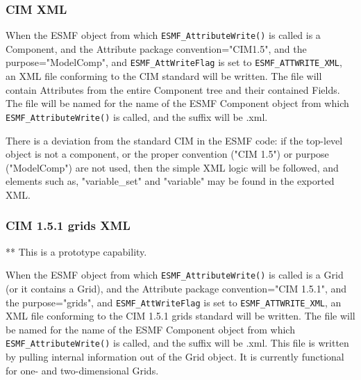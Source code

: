 \subsubsection{CIM XML}

\begin{sloppypar}
When the ESMF object from which {\tt ESMF\_AttributeWrite()} is called is a Component, and the Attribute package convention="CIM1.5", and the purpose="ModelComp", and {\tt ESMF\_AttWriteFlag} is set to {\tt ESMF\_ATTWRITE\_XML}, an XML file conforming to the CIM standard will be written.  The file will contain Attributes from the entire Component tree and their contained Fields.  The file will be named for the name of the ESMF Component object from which {\tt ESMF\_AttributeWrite()} is called, and the suffix will be .xml.
\end{sloppypar}

\begin{sloppypar}
There is a deviation from the standard CIM in the ESMF code: if the top-level object is not a component, or the proper convention ("CIM 1.5") or purpose ("ModelComp") are not used, then the simple XML logic will be followed, and elements such as, "variable\_set" and "variable" may be found in the exported XML.
\end{sloppypar}

\subsubsection{CIM 1.5.1 grids XML}

** This is a prototype capability.

When the ESMF object from which {\tt ESMF\_AttributeWrite()} is called is a Grid (or 
it contains a Grid), and the Attribute package convention="CIM 1.5.1", and the 
purpose="grids", and {\tt ESMF\_AttWriteFlag} is set to {\tt ESMF\_ATTWRITE\_XML}, an XML file conforming to the CIM 1.5.1 grids standard will be written.  The file will be named for the name of the ESMF Component object from which {\tt ESMF\_AttributeWrite()} is called, and the suffix will be .xml.  This file is written by pulling internal information out of the Grid object.  It is 
currently functional for one- and two-dimensional Grids.

